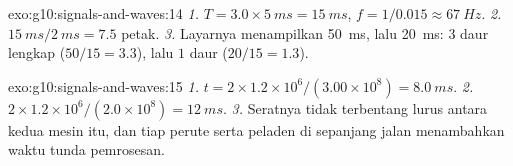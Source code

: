 \begin{solution}{exo:g10:signals-and-waves:14}
\emph{1.} $T = 3.0 \times \qty{5}{ms} = \qty{15}{ms}$,
$f = 1/0.015 \approx \qty{67}{Hz}$.
\emph{2.} $\qty{15}{ms}/\qty{2}{ms} = 7.5$ petak.
\emph{3.} Layarnya menampilkan \qty{50}{ms}, lalu \qty{20}{ms}: $3$ daur
lengkap ($50/15 = 3.3$), lalu $1$ daur ($20/15 = 1.3$).
\end{solution}

\begin{solution}{exo:g10:signals-and-waves:15}
\emph{1.} $t = 2 \times 1.2\times10^{6}/(3.00\times10^{8}) =
\qty{8.0}{ms}$.
\emph{2.} $2 \times 1.2\times10^{6}/(2.0\times10^{8}) = \qty{12}{ms}$.
\emph{3.} Seratnya tidak terbentang lurus antara kedua mesin itu, dan
tiap perute serta peladen di sepanjang jalan menambahkan waktu tunda
pemrosesan.
\end{solution}

